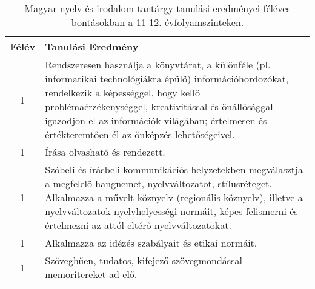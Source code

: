        
           \begin{longtable}{c | p{12cm} }
            \caption[Magyar nyelv és irodalom 11-12.]{Magyar nyelv és irodalom tantárgy tanulási eredményei féléves bontásokban a 11-12. évfolyamszinteken. }  \\

            \textbf{Félév} & \textbf{Tanulási Eredmény} \\
            \hline
            \endhead
                                
                                      
                                
                                          1 &  Rendszeresen használja a könyvtárat, a különféle (pl. informatikai technológiákra épülő) információhordozókat, rendelkezik a képességgel, hogy kellő problémaérzékenységgel, kreativitással és önállósággal igazodjon el az információk világában; értelmesen és értékteremtően él az önképzés lehetőségeivel. \\ \hline
                                          1 &  Írása olvasható és rendezett. \\ \hline
                                          1 &  Szóbeli és írásbeli kommunikációs helyzetekben megválasztja a megfelelő hangnemet, nyelvváltozatot, stílusréteget. Alkalmazza a művelt köznyelv (regionális köznyelv), illetve a nyelvváltozatok nyelvhelyességi normáit, képes felismerni és értelmezni az attól eltérő nyelvváltozatokat. \\ \hline
                                          1 &  Alkalmazza az idézés szabályait és etikai normáit. \\ \hline
                                          1 &  Szöveghűen, tudatos, kifejező szövegmondással memoritereket ad elő. \\ \hline
                                      

\end{longtable}

